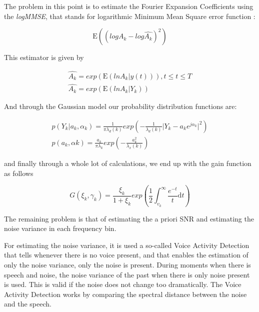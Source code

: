 \documentclass[11pt,a4paper,english]{book}  %
\theoremstyle{definition}  %
\theoremstyle{plain}  %
\theoremstyle{remark}  %
\begin{document}
The problem in this point is to estimate the Fourier Expansion Coefficients using the \textit{logMMSE}, that stands for logarithmic Minimum Mean Square error function \cite{logmmse}:


	\begin{equation}
	\label{eq:logmmse1}
		\mathrm{E}((log A_{k } - log\hat{A_{k}})^2)
	\end{equation}
	
	This estimator is given by
	
	\begin{subequations}
	\label{eq:logmmse2}
	\begin{align}
		\hat{A_{k}}=exp(\mathrm{E}(ln A_{k}\vert y(t))), t \leq t \leq T\\
		\hat{A_{k}}=exp(\mathrm{E}(ln A_{k}\vert Y_{k}))
		\end{align}
	\end{subequations}
	
	And through the Gaussian model our probability distribution functions are:
	
		\begin{subequations}
	\label{eq:logmmse2}
	\begin{align}
		p(Y_{k} \vert a_{k},\alpha_{k})=\frac{1}{\pi \lambda_{d}(k)} exp(-\frac{1}{\lambda_{d}(k)} \vert Y_{k}-a_{k} e^{j\alpha_{k}}\vert ^2) \\
		p(a_{k}, \alpha{k})=\frac{a_{k}}{\pi \lambda_{k}}exp(-\frac{a_{k}^2}{\lambda_{x}(k)})
		\end{align}
	\end{subequations}
	
	and finally through a whole lot of calculations, we end up with the gain function as follows
	
	
		\begin{equation}
	\label{eq:logmmse3}
		G(\xi_{k},\gamma_{k})=\frac{\xi_{k}}{1+ \xi_{k}} exp(\frac{1}{2} \int_{v_{k}}^\infty \frac{e^{-t}}{t} \mathrm{d}t)
	\end{equation}
	
	The remaining problem is that of estimating the a priori SNR and estimating the noise variance in each frequency bin.
	
For estimating the noise variance, it is used a so-called Voice Activity Detection that tells whenever there is no voice present, and that enables the estimation of only the noise variance, only the noise is present. During moments when there is speech and noise, the noise variance of the past when there is only noise present is used. This is valid if the noise does not change too dramatically. The Voice Activity Detection works by comparing the spectral distance between the noise and the speech.
\end{document}
